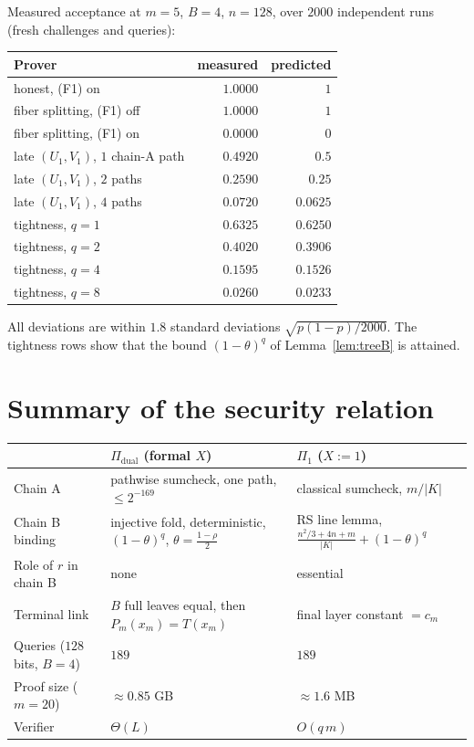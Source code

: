 \documentclass[11pt]{article}
\theoremstyle{definition}
\newcommand{\K}{K}
\begin{document}
Measured acceptance at $m=5$, $B=4$, $n=128$, over $2000$ independent runs (fresh challenges and queries):
\begin{center}
\begin{tabular}{@{}lrr@{}}
\toprule
Prover & measured & predicted \\
\midrule
honest, (F1) on & $1.0000$ & $1$ \\
fiber splitting, (F1) off & $1.0000$ & $1$ \\
fiber splitting, (F1) on & $0.0000$ & $0$ \\
late $(U_1,V_1)$, $1$ chain-A path & $0.4920$ & $0.5$ \\
late $(U_1,V_1)$, $2$ paths & $0.2590$ & $0.25$ \\
late $(U_1,V_1)$, $4$ paths & $0.0720$ & $0.0625$ \\
tightness, $q=1$ & $0.6325$ & $0.6250$ \\
tightness, $q=2$ & $0.4020$ & $0.3906$ \\
tightness, $q=4$ & $0.1595$ & $0.1526$ \\
tightness, $q=8$ & $0.0260$ & $0.0233$ \\
\bottomrule
\end{tabular}
\end{center}
All deviations are within $1.8$ standard deviations $\sqrt{p(1-p)/2000}$. The tightness rows show that the bound $(1-\theta)^q$ of Lemma~\ref{lem:treeB} is attained.

\section{Summary of the security relation}

\begin{center}
\begin{tabular}{@{}p{3.6cm}p{5.3cm}p{5.3cm}@{}}
\toprule
 & $\Pi_{\mathrm{dual}}$ (formal $X$) & $\Pi_1$ ($X:=1$) \\
\midrule
Chain A & pathwise sumcheck, one path, $\le2^{-169}$ & classical sumcheck, $m/|\K|$ \\
Chain B binding & injective fold, deterministic, $(1-\theta)^q$, $\theta=\frac{1-\rho}2$ & RS line lemma, $\frac{n^2/3+4n+m}{|\K|}+(1-\theta)^q$ \\
Role of $r$ in chain B & none & essential \\
Terminal link & $B$ full leaves equal, then $P_m(x_m)=T(x_m)$ & final layer constant $=c_m$ \\
Queries ($128$ bits, $B=4$) & $189$ & $189$ \\
Proof size ($m=20$) & $\approx0.85$ GB & $\approx1.6$ MB \\
Verifier & $\Theta(L)$ & $O(q\,m)$ \\
\bottomrule
\end{tabular}
\end{center}
\end{document}
